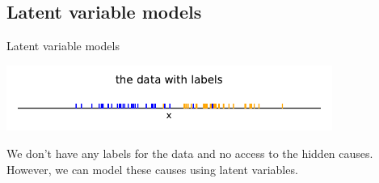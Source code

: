 \subsection{Latent variable models}

\begin{frame}{Latent variable models}

\begin{center}
	\includegraphics[width=0.8\textwidth]{img/latentexample_nofit_labels}
\end{center}

We don't have any labels for the data and no access to the hidden causes. However, we can model these causes using latent variables.

\end{frame}

